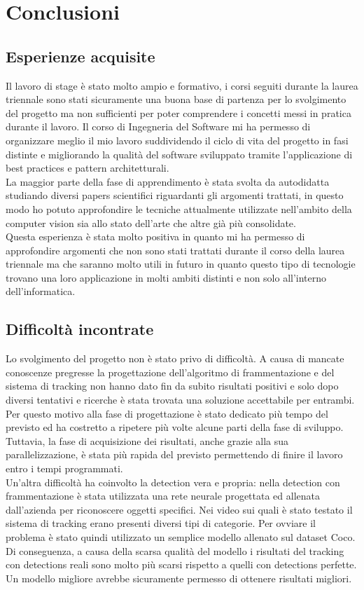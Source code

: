 \section{Conclusioni}

\subsection{Esperienze acquisite}
Il lavoro di stage è stato molto ampio e formativo, i corsi seguiti durante la laurea triennale sono stati sicuramente una buona base di partenza per lo svolgimento del progetto ma non sufficienti per poter comprendere i concetti messi in pratica durante il lavoro. Il corso di Ingegneria del Software mi ha permesso di organizzare meglio il mio lavoro suddividendo il ciclo di vita del progetto in fasi distinte e migliorando la qualità del software sviluppato tramite l'applicazione di best practices e pattern architetturali.\\
La maggior parte della fase di apprendimento è stata svolta da autodidatta studiando diversi papers scientifici riguardanti gli argomenti trattati, in questo modo ho potuto approfondire le tecniche attualmente utilizzate nell'ambito della computer vision sia allo stato dell'arte che altre già più consolidate.\\
Questa esperienza è stata molto positiva in quanto mi ha permesso di approfondire argomenti che non sono stati trattati durante il corso della laurea triennale ma che saranno molto utili in futuro in quanto questo tipo di tecnologie trovano una loro applicazione in molti ambiti distinti e non solo all'interno dell'informatica.

\subsection{Difficoltà incontrate}
Lo svolgimento del progetto non è stato privo di difficoltà. A causa di mancate conoscenze pregresse la progettazione dell'algoritmo di frammentazione e del sistema di tracking non hanno dato fin da subito risultati positivi e solo dopo diversi tentativi e ricerche è stata trovata una soluzione accettabile per entrambi. Per questo motivo alla fase di progettazione è stato dedicato più tempo del previsto ed ha costretto a ripetere più volte alcune parti della fase di sviluppo. Tuttavia, la fase di acquisizione dei risultati, anche grazie alla sua parallelizzazione, è stata più rapida del previsto permettendo di finire il lavoro entro i tempi programmati.\\
Un'altra difficoltà ha coinvolto la detection vera e propria: nella detection con frammentazione è stata utilizzata una rete neurale progettata ed allenata dall'azienda per riconoscere oggetti specifici. Nei video sui quali è stato testato il sistema di tracking erano presenti diversi tipi di categorie. Per ovviare il problema è stato quindi utilizzato un semplice modello allenato sul dataset Coco. Di conseguenza, a causa della scarsa qualità del modello i risultati del tracking con detections reali sono molto più scarsi rispetto a quelli con detections perfette. Un modello migliore avrebbe sicuramente permesso di ottenere risultati migliori. 